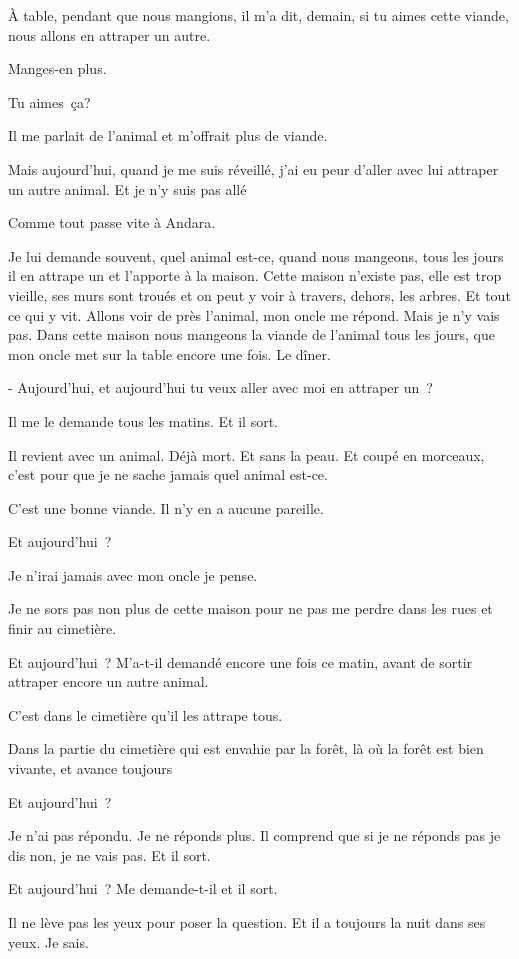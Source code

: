 À table, pendant que nous mangions, il m'a dit, demain, si tu aimes
cette viande, nous allons en attraper un autre.

Manges-en plus.

Tu aimes~ça?

Il me parlait de l'animal et m'offrait plus de viande.

Mais aujourd'hui, quand je me suis réveillé, j'ai eu peur d'aller avec
lui attraper un autre animal. Et je n'y suis pas allé

Comme tout passe vite à Andara.

Je lui demande souvent, quel animal est-ce, quand nous mangeons, tous
les jours il en attrape un et l'apporte à la maison. Cette maison
n'existe pas, elle est trop vieille, ses murs sont troués et on peut y
voir à travers, dehors, les arbres. Et tout ce qui y vit. Allons voir de
près l'animal, mon oncle me répond. Mais je n'y vais pas. Dans cette
maison nous mangeons la viande de l'animal tous les jours, que mon oncle
met sur la table encore une fois. Le dîner.

- Aujourd'hui, et aujourd'hui tu veux aller avec moi en attraper un~?

Il me le demande tous les matins. Et il sort.

Il revient avec un animal. Déjà mort. Et sans la peau. Et coupé en
morceaux, c'est pour que je ne sache jamais quel animal est-ce.

C'est une bonne viande. Il n'y en a aucune pareille.

Et aujourd'hui~?

Je n'irai jamais avec mon oncle je pense.

Je ne sors pas non plus de cette maison pour ne pas me perdre dans les
rues et finir au cimetière.

Et aujourd'hui~? M'a-t-il demandé encore une fois ce matin, avant de
sortir attraper encore un autre animal.

C'est dans le cimetière qu'il les attrape tous.

Dans la partie du cimetière qui est envahie par la forêt, là où la forêt
est bien vivante, et avance toujours

Et aujourd'hui~?

Je n'ai pas répondu. Je ne réponds plus. Il comprend que si je ne
réponds pas je dis non, je ne vais pas. Et il sort.

Et aujourd'hui~? Me demande-t-il et il sort.

Il ne lève pas les yeux pour poser la question. Et il a toujours la nuit
dans ses yeux. Je sais.

